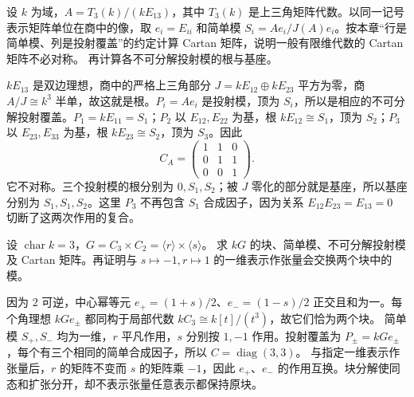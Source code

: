 \begin{optionalexercise}\label{b5:ex:08-nonsymmetric-cartan}
	设 \(k\) 为域，\(A=T_3(k)/(kE_{13})\)，其中 \(T_3(k)\) 是上三角矩阵代数。以同一记号表示矩阵单位在商中的像，取 \(e_i=E_{ii}\) 和简单模 \(S_i=Ae_i/J(A)e_i\)。按本章“行是简单模、列是投射覆盖”的约定计算 Cartan 矩阵，说明一般有限维代数的 Cartan 矩阵不必对称。 再计算各不可分解投射模的根与基座。
\end{optionalexercise}
\begin{solution}
	\(kE_{13}\) 是双边理想，商中的严格上三角部分 \(J=kE_{12}\oplus kE_{23}\) 平方为零，商 \(A/J\cong k^3\) 半单，故这就是根。\(P_i=Ae_i\) 是投射模，顶为 \(S_i\)，所以是相应的不可分解投射覆盖。\(P_1=kE_{11}=S_1\)；\(P_2\) 以 \(E_{12},E_{22}\) 为基，根 \(kE_{12}\cong S_1\)，顶为 \(S_2\)；\(P_3\) 以 \(E_{23},E_{33}\) 为基，根 \(kE_{23}\cong S_2\)，顶为 \(S_3\)。因此
	\[
		C_A=\begin{pmatrix}1&1&0\\0&1&1\\0&0&1\end{pmatrix}.
	\]
	它不对称。三个投射模的根分别为 \(0,S_1,S_2\)；被 \(J\) 零化的部分就是基座，所以基座分别为 \(S_1,S_1,S_2\)。这里 \(P_3\) 不再包含 \(S_1\) 合成因子，因为关系 \(E_{12}E_{23}=E_{13}=0\) 切断了这两次作用的复合。
\end{solution}

\begin{optionalexercise}\label{b5:ex:08-c6-blocks}
	设 \(\operatorname{char}k=3\)，\(G=C_3\times C_2=\langle r\rangle\times\langle s\rangle\)。 求 \(kG\) 的块、简单模、不可分解投射模及 Cartan 矩阵。再证明与 \(s\mapsto-1,r\mapsto1\) 的一维表示作张量会交换两个块中的模。
\end{optionalexercise}
\begin{solution}
	因为 \(2\) 可逆，中心幂等元 \(e_+=(1+s)/2\)、\(e_-=(1-s)/2\) 正交且和为一。每个角理想 \(kGe_\pm\) 都同构于局部代数 \(kC_3\cong k[t]/(t^3)\)，故它们恰为两个块。 简单模 \(S_+,S_-\) 均为一维，\(r\) 平凡作用，\(s\) 分别按 \(1,-1\) 作用。投射覆盖为 \(P_\pm=kGe_\pm\)，每个有三个相同的简单合成因子，所以 \(C=\operatorname{diag}(3,3)\)。 与指定一维表示作张量后，\(r\) 的矩阵不变而 \(s\) 的矩阵乘 \(-1\)，因此 \(e_+\)、\(e_-\) 的作用互换。块分解使同态和扩张分开，却不表示张量任意表示都保持原块。
\end{solution}

